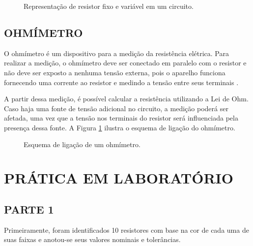 \documentclass[12pt]{article}
\begin{document}
    \begin{figure}[H]
        \centering
        \caption{Representação de resistor fixo e variável em um circuito.}
    \end{figure}
    
    \subsection{OHMÍMETRO}
    O ohmímetro é um dispositivo para a medição da resistência elétrica. Para realizar a medição, o ohmímetro deve ser conectado em paralelo com o resistor e não deve ser exposto a nenhuma tensão externa, pois o aparelho funciona fornecendo uma corrente ao resistor e medindo a tensão entre seus terminais \parencite{ohmmeter_website}.
    
    A partir dessa medição, é possível calcular a resistência utilizando a Lei de Ohm. Caso haja uma fonte de tensão adicional no circuito, a medição poderá ser afetada, uma vez que a tensão nos terminais do resistor será influenciada pela presença dessa fonte. A Figura \ref{fig:ohmimetro} ilustra o esquema de ligação do ohmímetro.
    \begin{figure}[H]
        \centering
        \caption{Esquema de ligação de um ohmímetro.}
        \begin{minipage}{0.5\textwidth}
            \centering
            \label{fig:ohmimetro}
        \end{minipage}
    \end{figure}

\section{PRÁTICA EM LABORATÓRIO}
\subsection{PARTE 1}
Primeiramente, foram identificados 10 resistores com base na cor de cada uma de suas faixas  e anotou-se seus valores nominais e tolerâncias.
\end{document}
